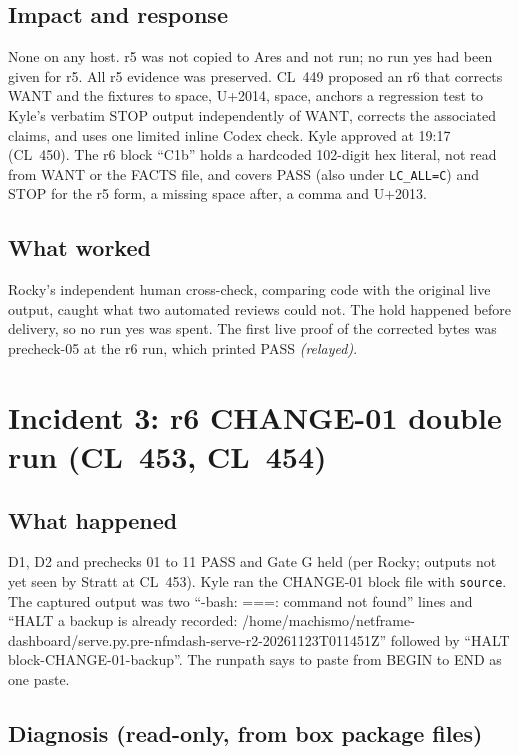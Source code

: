 \documentclass[10pt]{article}
\newcommand{\CL}[1]{CL~#1}
\newcommand{\relay}{\textit{(relayed)}}
\begin{document}
\subsection{Impact and response}

None on any host. r5 was not copied to Ares and not run; no run yes had been given for r5. All r5 evidence was preserved. \CL{449} proposed an r6 that corrects WANT and the fixtures to space, U+2014, space, anchors a regression test to Kyle's verbatim STOP output independently of WANT, corrects the associated claims, and uses one limited inline Codex check. Kyle approved at 19:17 (\CL{450}). The r6 block ``C1b'' holds a hardcoded 102-digit hex literal, not read from WANT or the FACTS file, and covers PASS (also under \texttt{LC\_ALL=C}) and STOP for the r5 form, a missing space after, a comma and U+2013.

\subsection{What worked}

Rocky's independent human cross-check, comparing code with the original live output, caught what two automated reviews could not. The hold happened before delivery, so no run yes was spent. The first live proof of the corrected bytes was precheck-05 at the r6 run, which printed PASS \relay{}.

\section{Incident 3: r6 CHANGE-01 double run (\CL{453}, \CL{454})}

\subsection{What happened}

D1, D2 and prechecks 01 to 11 PASS and Gate G held (per Rocky; outputs not yet seen by Stratt at \CL{453}). Kyle ran the CHANGE-01 block file with \texttt{source}. The captured output was two ``-bash: ===: command not found'' lines and ``HALT a backup is already recorded: /home/machismo/netframe-dashboard/serve.py.pre-nfmdash-serve-r2-20261123T011451Z'' followed by ``HALT block-CHANGE-01-backup''. The runpath says to paste from BEGIN to END as one paste.

\subsection{Diagnosis (read-only, from box package files)}
\end{document}

